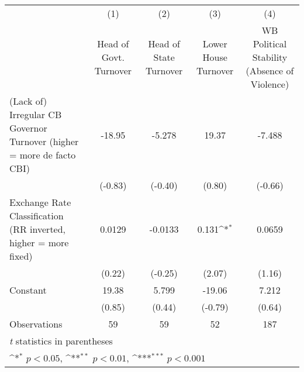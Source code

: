 {
\def\sym#1{\ifmmode^{#1}\else\(^{#1}\)\fi}
\begin{tabular*}{\linewidth}{@{\hskip\tabcolsep\extracolsep\fill}l*{4}{c}}
\toprule
                &\multicolumn{1}{c}{(1)}&\multicolumn{1}{c}{(2)}&\multicolumn{1}{c}{(3)}&\multicolumn{1}{c}{(4)}\\
                &\multicolumn{1}{c}{Head of Govt. Turnover}&\multicolumn{1}{c}{Head of State Turnover}&\multicolumn{1}{c}{Lower House Turnover}&\multicolumn{1}{c}{WB Political Stability (Absence of Violence)}\\
\midrule
(Lack of) Irregular CB Governor Turnover (higher = more de facto CBI)&   -18.95         &   -5.278         &    19.37         &   -7.488         \\
                &  (-0.83)         &  (-0.40)         &   (0.80)         &  (-0.66)         \\
\addlinespace
Exchange Rate Classification (RR inverted, higher = more fixed)&   0.0129         &  -0.0133         &    0.131\sym{*}  &   0.0659         \\
                &   (0.22)         &  (-0.25)         &   (2.07)         &   (1.16)         \\
\addlinespace
Constant        &    19.38         &    5.799         &   -19.06         &    7.212         \\
                &   (0.85)         &   (0.44)         &  (-0.79)         &   (0.64)         \\
\midrule
Observations    &       59         &       59         &       52         &      187         \\
\bottomrule
\multicolumn{5}{l}{\footnotesize \textit{t} statistics in parentheses}\\
\multicolumn{5}{l}{\footnotesize \sym{*} \(p<0.05\), \sym{**} \(p<0.01\), \sym{***} \(p<0.001\)}\\
\end{tabular*}
}

